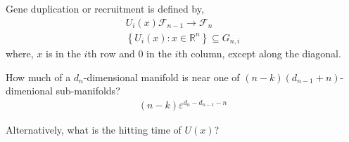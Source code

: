 \documentclass[11 pt]{article}
\newcommand{\1}{\mathbbm{1}}
\begin{document}
Gene duplication or recruitment is defined by, 
  \begin{align*}
        U_{i}(x) \mathcal{F}_{n-1} \rightarrow \mathcal{F}_{n} \\
        \left\{ U_{i}(x) : x \in \mathbb{R}^{n} \right\} \subseteq G_{n,i} 
  \end{align*}
  where, $x$ is in the $i$th row and $0$ in the $i$th column, except along the diagonal. 

  How much of a $d_{n}$-dimensional manifold is near one of $(n-k)(d_{n-1}+n)$-dimenional sub-manifolds? 
  \begin{align*}
    (n-k)\varepsilon^{d_{n}-d_{n-1} - n}
  \end{align*}

  Alternatively, what is the hitting time of $U(x)$?
\end{document}
